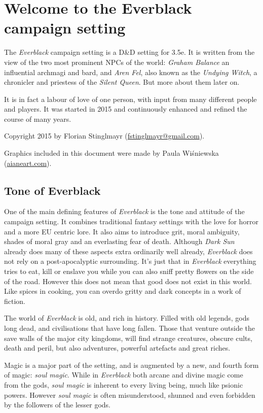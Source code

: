 \twocolumn
\section{Welcome to the Everblack campaign setting}

The \emph{Everblack} campaign setting is a D\&D setting for 3.5e.  It is
written from the view of the two most prominent NPCs of the world:
\emph{Graham Balance} an influential archmagi and bard, and \emph{Aren Fel},
also known as the \emph{Undying Witch}, a chronicler and priestess of the
\emph{Silent Queen}. But more about them later on.

It is in fact a labour of love of one person, with input from many different
people and players. It was started in 2015 and continuously enhanced and
refined the course of many years.

Copyright 2015 by Florian Stinglmayr
(\href{mailto:fstinglmayr@gmail.com}{fstinglmayr@gmail.com}).

Graphics included in this document were made by Paula Wiśniewska
(\href{http://aianeart.com}{aianeart.com}).

\subsection{Tone of Everblack}

One of the main defining features of \emph{Everblack} is the tone and attitude
of the campaign setting. It combines traditional fantasy settings with the love
for horror and a more EU centric lore. It also aims to introduce grit, moral
ambiguity, shades of moral gray and an everlasting fear of
death. Although \emph{Dark Sun} already does many of these aspects extra
ordinarily well already, \emph{Everblack} does not rely on a
post-apocalyptic surrounding. It's just that in \emph{Everblack} everything
tries to eat, kill or enslave you while you can also sniff pretty flowers on
the side of the road. However this does not mean that good does not exist in
this world. Like spices in cooking, you can overdo gritty and dark concepts in
a work of fiction.

The world of \emph{Everblack} is old, and rich in history. Filled with old
legends, gods long dead, and civilisations that have long fallen. Those that
venture outside the save walls of the major city kingdoms, will find strange
creatures, obscure cults, death and peril, but also adventures, powerful
artefacts and great riches.

Magic is a major part of the setting, and is augmented by a new, and fourth
form of magic: \emph{soul magic}. While in \emph{Everblack} both arcane and
divine magic come from the gods, \emph{soul magic} is inherent to every living
being, much like psionic powers. However \emph{soul magic} is often
misunderstood, shunned and even forbidden by the followers of the lesser gods.

